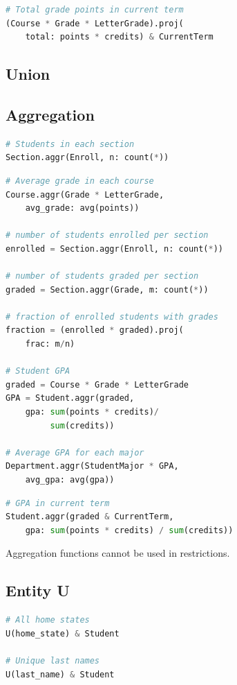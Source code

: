 \documentclass[letter,10pt]{article}
\begin{document}
\begin{lstlisting}[language=Python, caption={}]
# Total grade points in current term
(Course * Grade * LetterGrade).proj(
    total: points * credits) & CurrentTerm
\end{lstlisting}

\subsection{Union}\label{sec:union}

\subsection{Aggregation}\label{sec:aggr}
\begin{lstlisting}[language=Python, caption={Calculate summary statistics.}, label={lst:aggr1}]
# Students in each section
Section.aggr(Enroll, n: count(*))
\end{lstlisting}

\begin{lstlisting}[language=Python, caption={Aggregation in expressions.}, label={lst:aggr2}]
# Average grade in each course
Course.aggr(Grade * LetterGrade, 
    avg_grade: avg(points))

# number of students enrolled per section
enrolled = Section.aggr(Enroll, n: count(*))

# number of students graded per section
graded = Section.aggr(Grade, m: count(*))

# fraction of enrolled students with grades
fraction = (enrolled * graded).proj(
    frac: m/n)

# Student GPA
graded = Course * Grade * LetterGrade
GPA = Student.aggr(graded,
    gpa: sum(points * credits)/
         sum(credits))

# Average GPA for each major
Department.aggr(StudentMajor * GPA, 
    avg_gpa: avg(gpa))
\end{lstlisting}

\begin{lstlisting}[language=Python, caption={Reuse of variables}, label={lst:aggr3}]
# GPA in current term
Student.aggr(graded & CurrentTerm, 
    gpa: sum(points * credits) / sum(credits))
\end{lstlisting}

Aggregation functions cannot be used in restrictions. 
\subsection{Entity U}\label{sec:u}
\begin{lstlisting}[language=Python, morekeywords={avg, U}, caption={Creating a new entity.}, label={lst:u1}]
# All home states
U(home_state) & Student

# Unique last names
U(last_name) & Student 
\end{lstlisting}
\end{document}
